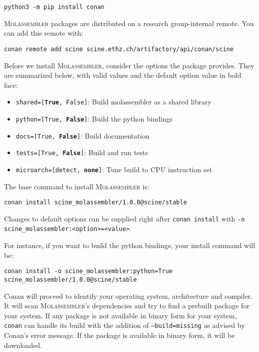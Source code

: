 \documentclass[]{tufte-book}
\begin{document}
\begin{Verbatim}
python3 -m pip install conan
\end{Verbatim}

\textsc{Molassembler} packages are distributed on a research group-internal
remote. You can add this remote with:

\begin{Verbatim}
conan remote add scine scine.ethz.ch/artifactory/api/conan/scine
\end{Verbatim}

Before we install \textsc{Molassembler}, consider the options the package 
provides. They are summarized below, with valid values and the default option
value in bold face:

\begin{itemize} 
  \item \texttt{shared=[\textbf{True}, False]}: Build molassembler as a shared
    library
  \item \texttt{python=[True, \textbf{False}]}: Build the python bindings
  \item \texttt{docs=[True, \textbf{False}]}: Build documentation
  \item \texttt{tests=[True, \textbf{False}]}: Build and run tests
  \item \texttt{microarch=[detect, \textbf{none}]}: Tune build to CPU
    instruction set
\end{itemize}

The base command to install \textsc{Molassembler} is:

\begin{Verbatim}
conan install scine_molassembler/1.0.0@scine/stable
\end{Verbatim}

Changes to default options can be supplied right after \texttt{conan install}
with \texttt{-o scine\_molassembler:<option>=<value>}.

For instance, if you want to build the python bindings, your install command
will be:

\begin{Verbatim}
conan install -o scine_molassembler:python=True scine_molassembler/1.0.0@scine/stable
\end{Verbatim}

Conan will proceed to identify your operating system, architecture and compiler.
It will scan \textsc{Molassembler}'s dependencies and try to find a prebuilt
package for your system. If any package is not available in binary form for your
system, \texttt{conan} can handle its build with the addition of
\texttt{--build=missing} as advised by Conan's error message. If the package is
available in binary form, it will be downloaded.
\end{document}
